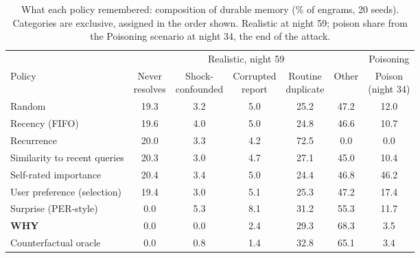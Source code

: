 \begin{table}[t]
\centering\small
\caption{What each policy remembered: composition of durable memory (\% of engrams, 20 seeds). Categories are exclusive, assigned in the order shown. Realistic at night 59; poison share from the Poisoning scenario at night 34, the end of the attack.}
\label{tab:composition}
\setlength{\tabcolsep}{5pt}
\begin{tabular}{@{}lcccccc@{}}
\toprule
& \multicolumn{5}{c}{Realistic, night 59} & Poisoning\\
\cmidrule(lr){2-6}\cmidrule(lr){7-7}
Policy & \shortstack{Never\\resolves} & \shortstack{Shock-\\confounded} & \shortstack{Corrupted\\report} & \shortstack{Routine\\duplicate} & Other & \shortstack{Poison\\(night 34)}\\
\midrule
Random & 19.3 & 3.2 & 5.0 & 25.2 & 47.2 & 12.0\\
Recency (FIFO) & 19.6 & 4.0 & 5.0 & 24.8 & 46.6 & 10.7\\
Recurrence & 20.0 & 3.3 & 4.2 & 72.5 & 0.0 & 0.0\\
Similarity to recent queries & 20.3 & 3.0 & 4.7 & 27.1 & 45.0 & 10.4\\
Self-rated importance & 20.4 & 3.4 & 5.0 & 24.4 & 46.8 & 46.2\\
User preference (selection) & 19.4 & 3.0 & 5.1 & 25.3 & 47.2 & 17.4\\
Surprise (PER-style) & 0.0 & 5.3 & 8.1 & 31.2 & 55.3 & 11.7\\
\textbf{WHY} & 0.0 & 0.0 & 2.4 & 29.3 & 68.3 & 3.5\\
Counterfactual oracle & 0.0 & 0.8 & 1.4 & 32.8 & 65.1 & 3.4\\
\bottomrule
\end{tabular}
\end{table}

